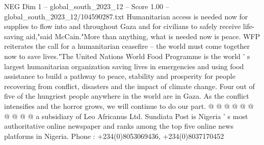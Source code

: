 \begin{textsample}{NEG Dim 1 – global\_south\_2023\_12 – Score 1.00 – global\_south\_2023\_12/104590287.txt}
Humanitarian access is needed now for supplies to flow into and throughout Gaza and for civilians to safely receive life-saving aid,"said McCain."More than anything, what is needed now is peace.
WFP reiterates the call for a humanitarian ceasefire -- the world must come together now to save lives."The United Nations World Food Programme is the world ' s largest humanitarian organization saving lives in emergencies and using food assistance to build a pathway to peace, stability and prosperity for people recovering from conflict, disasters and the impact of climate change.
Four out of five of the hungriest people anywhere in the world are in Gaza.
As the conflict intensifies and the horror grows, we will continue to do our part. @ @ @ @ @ @ @ @ @ @ a subsidiary of Leo Africanus Ltd.
Sundiata Post is Nigeria ' s most authoritative online newspaper and ranks among the top five online news platforms in Nigeria.
Phone : +234(0)8053069436, +234(0)8037170452

\end{textsample}
